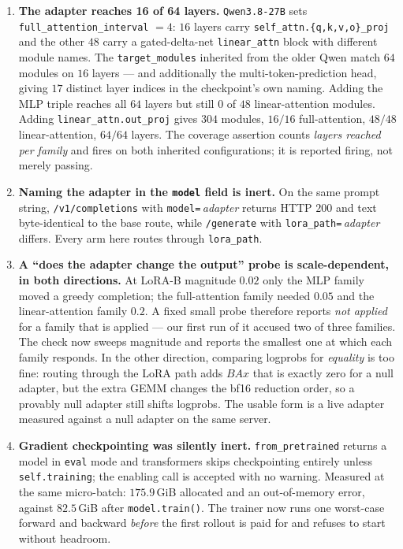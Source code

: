 \begin{enumerate}
\item \textbf{The adapter reaches 16 of 64 layers.} \texttt{Qwen3.8-27B} sets
  \texttt{full\_attention\_interval} $=4$: $16$ layers carry
  \texttt{self\_attn.\{q,k,v,o\}\_proj} and the other $48$ carry a gated-delta-net
  \texttt{linear\_attn} block with different module names. The \texttt{target\_modules}
  inherited from the older Qwen match $64$ modules on $16$ layers --- and additionally the
  multi-token-prediction head, giving $17$ distinct layer indices in the checkpoint's own
  naming. Adding the MLP triple reaches all $64$ layers but still $0$ of $48$
  linear-attention modules. Adding \texttt{linear\_attn.out\_proj} gives $304$ modules,
  $16/16$ full-attention, $48/48$ linear-attention, $64/64$ layers. The coverage assertion
  counts \emph{layers reached per family} and fires on both inherited configurations; it is
  reported firing, not merely passing.
\item \textbf{Naming the adapter in the \texttt{model} field is inert.} On the same prompt
  string, \texttt{/v1/completions} with \texttt{model=}\,\emph{adapter} returns HTTP $200$ and
  text byte-identical to the base route, while \texttt{/generate} with
  \texttt{lora\_path=}\,\emph{adapter} differs. Every arm here routes through
  \texttt{lora\_path}.
\item \textbf{A ``does the adapter change the output'' probe is scale-dependent, in both
  directions.} At LoRA-B magnitude $0.02$ only the MLP family moved a greedy completion; the
  full-attention family needed $0.05$ and the linear-attention family $0.2$. A fixed small
  probe therefore reports \emph{not applied} for a family that is applied --- our first run of
  it accused two of three families. The check now sweeps magnitude and reports the smallest
  one at which each family responds. In the other direction, comparing logprobs for
  \emph{equality} is too fine: routing through the LoRA path adds $BAx$ that is exactly zero
  for a null adapter, but the extra GEMM changes the bf16 reduction order, so a provably null
  adapter still shifts logprobs. The usable form is a live adapter measured against a null
  adapter on the same server.
\item \textbf{Gradient checkpointing was silently inert.} \texttt{from\_pretrained} returns a
  model in \texttt{eval} mode and transformers skips checkpointing entirely unless
  \texttt{self.training}; the enabling call is accepted with no warning. Measured at the same
  micro-batch: $175.9$\,GiB allocated and an out-of-memory error, against $\mathbf{82.5}$\,GiB
  after \texttt{model.train()}. The trainer now runs one worst-case forward and backward
  \emph{before} the first rollout is paid for and refuses to start without headroom.
\end{enumerate}

